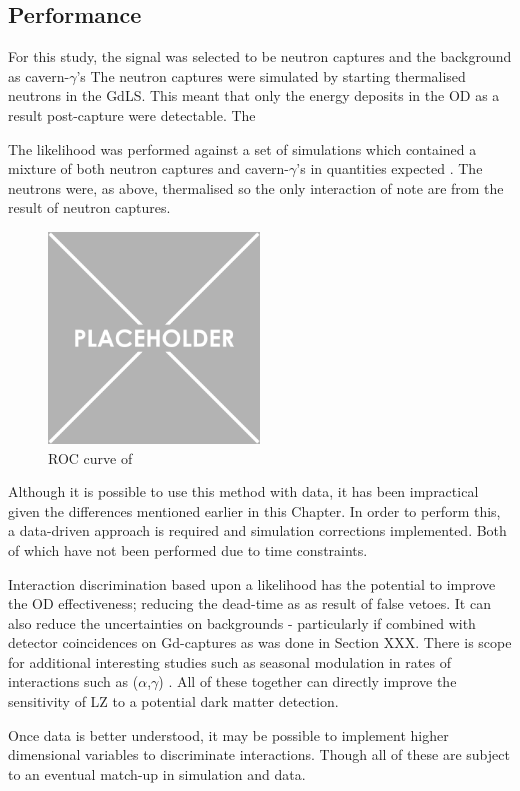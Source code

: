 \subsection{Performance}
\par
For this study, the signal was selected to be neutron captures and the background as cavern-$\gamma$'s
The neutron captures were simulated by starting thermalised neutrons in the GdLS.
This meant that only the energy deposits in the OD as a result post-capture were detectable.
The 
\par
The likelihood was performed against a set of simulations which contained a mixture of both neutron captures and cavern-$\gamma$'s in quantities expected \cite{LZ_assay_ref}.
The neutrons were, as above, thermalised so the only interaction of note are from the result of neutron captures.






\begin{figure}[!htbp]
    \centering
    \includegraphics[width=0.5\textwidth]{Figures/Placeholder.png}
    \caption{ROC curve of}
    \label{fig:discrimination_performance}
\end{figure}

\par
Although it is possible to use this method with data, it has been impractical given the differences mentioned earlier in this Chapter.
In order to perform this, a data-driven approach is required and simulation corrections implemented.
Both of which have not been performed due to time constraints.





\par
Interaction discrimination based upon a likelihood has the potential to improve the OD effectiveness; reducing the dead-time as as result of false vetoes.
It can also reduce the uncertainties on backgrounds - particularly if combined with detector coincidences on Gd-captures as was done in Section XXX.
There is scope for additional interesting studies such as seasonal modulation in rates of interactions such as ($\alpha$,$\gamma$) \cite{cavern_gammas_in_Soudan_mine_ref}.
All of these together can directly improve the sensitivity of LZ to a potential dark matter detection.

\par
Once data is better understood, it may be possible to implement higher dimensional variables to discriminate interactions.
Though all of these are subject to an eventual match-up in simulation and data.
